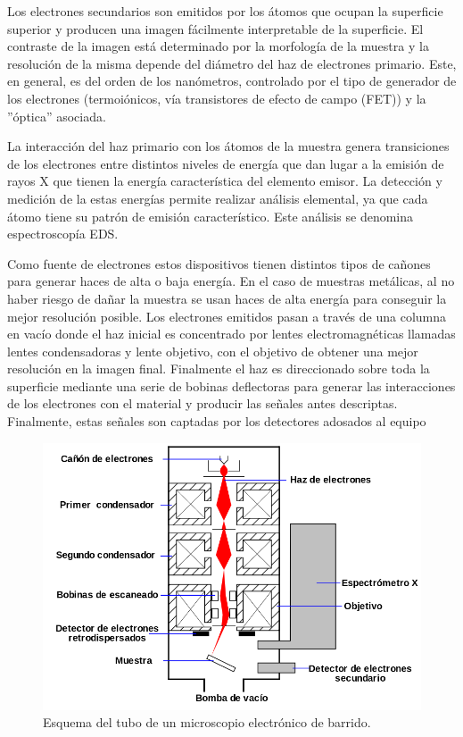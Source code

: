 \documentclass[12pt]{article}
\theoremstyle{definition}
\theoremstyle{remark}
\begin{document}
Los electrones secundarios son emitidos por los átomos que ocupan la superficie superior y producen una imagen fácilmente interpretable de la superficie. El contraste de la imagen está determinado por la morfología de la muestra y la resolución de la misma depende del diámetro del haz de electrones primario. Este, en general, es del orden de los nanómetros, controlado por el tipo de generador de los electrones (termoiónicos, vía transistores de efecto de campo (FET)) y la ''óptica” asociada.

La interacción del haz primario con los átomos de la muestra genera transiciones de los electrones entre distintos niveles de energía que dan lugar a la emisión de rayos X que tienen la energía característica del elemento emisor. La detección y medición de la estas energías permite realizar análisis elemental, ya que cada átomo tiene su patrón de emisión característico. Este análisis se denomina espectroscopía EDS.

Como fuente de electrones estos dispositivos tienen distintos tipos de cañones para generar haces de alta o baja energía. En el caso de muestras metálicas, al no haber riesgo de dañar la muestra se usan haces de alta energía para conseguir la mejor resolución posible. Los electrones emitidos pasan a través de una columna en vacío donde el haz inicial es concentrado por lentes electromagnéticas llamadas lentes condensadoras y lente objetivo, con el objetivo de obtener una mejor resolución en la imagen final. Finalmente el haz es direccionado sobre toda la superficie mediante una serie de bobinas deflectoras para generar las interacciones de los electrones con el material y producir las señales antes descriptas. Finalmente, estas señales son captadas por los detectores adosados al equipo

 \begin{figure}[H]
 	\centering
	\includegraphics[scale=0.5]{img/SEM.png}
 	\caption{Esquema del tubo de un microscopio electrónico de barrido.}
	\label{SEM}
\end{figure} 
\end{document}
